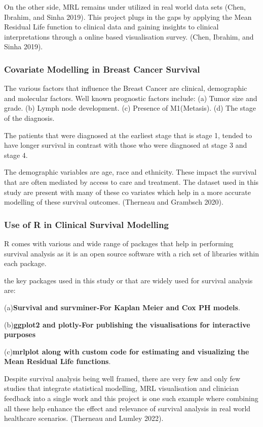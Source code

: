 \documentclass{article}
\begin{document}
On the other side, MRL remains under utilized in real world data sets (Chen, Ibrahim, and Sinha 2019). This project plugs in the gaps by applying the Mean Residual Life function to clinical data and gaining insights to clinical interpretations through a online based visualisation survey. (Chen, Ibrahim, and Sinha 2019).

\subsubsection{Covariate Modelling in Breast Cancer Survival}\label{covariate-modelling-in-breast-cancer-survival}

The various factors that influence the Breast Cancer are clinical, demographic and molecular factors. Well known prognostic factors include:
(a) Tumor size and grade.
(b) Lymph node development.
(c) Presence of M1(Metasis).
(d) The stage of the diagnosis.

The patients that were diagnosed at the earliest stage that is stage 1, tended to have longer survival in contrast with those who were diagnosed at stage 3 and stage 4.

The demographic variables are age, race and ethnicity. These impact the survival that are often mediated by access to care and treatment. The dataset used in this study are present with many of these co variates which help in a more accurate modelling of these survival outcomes. (Therneau and Grambsch 2020).

\subsubsection{Use of R in Clinical Survival Modelling}\label{use-of-r-in-clinical-survival-modelling}

R comes with various and wide range of packages that help in performing survival analysis as it is an open source software with a rich set of libraries within each package.

the key packages used in this study or that are widely used for survival analysis are:

(a)\textbf{Survival and survminer-For Kaplan Meier and Cox PH models}.

(b)\textbf{ggplot2 and plotly-For publishing the visualisations for interactive purposes}

(c)\textbf{mrlplot along with custom code for estimating and visualizing the Mean Residual Life functions}.

Despite survival analysis being well framed, there are very few and only few studies that integrate statistical modelling, MRL visualisation and clinician feedback into a single work and this project is one such example where combining all these help enhance the effect and relevance of survival analysis in real world healthcare scenarios. (Therneau and Lumley 2022).
\end{document}
